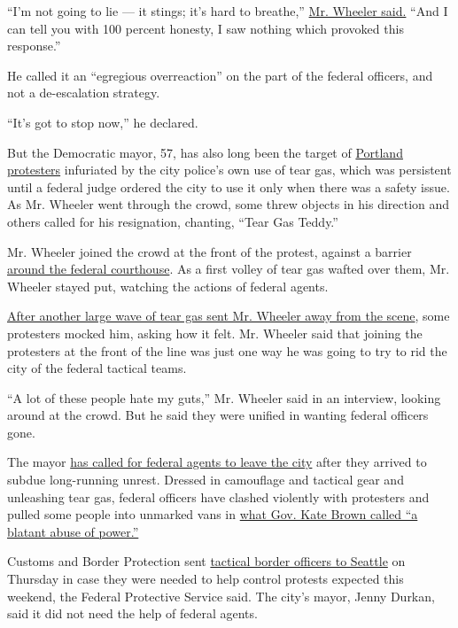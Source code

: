 ``I'm not going to lie --- it stings; it's hard to breathe,''
\href{https://twitter.com/ByMikeBaker/status/1286186731763412993}{Mr.
Wheeler said.} ``And I can tell you with 100 percent honesty, I saw
nothing which provoked this response.''

He called it an ``egregious overreaction'' on the part of the federal
officers, and not a de-escalation strategy.

``It's got to stop now,'' he declared.

But the Democratic mayor, 57, has also long been the target of
\href{https://www.nytimes3xbfgragh.onion/article/portland-protests-explained-protesters.html}{Portland
protesters} infuriated by the city police's own use of tear gas, which
was persistent until a federal judge ordered the city to use it only
when there was a safety issue. As Mr. Wheeler went through the crowd,
some threw objects in his direction and others called for his
resignation, chanting, ``Tear Gas Teddy.''

Mr. Wheeler joined the crowd at the front of the protest, against a
barrier
\href{https://www.nytimes3xbfgragh.onion/2020/07/22/us/portland-protests-courthouse.html}{around
the federal courthouse}. As a first volley of tear gas wafted over them,
Mr. Wheeler stayed put, watching the actions of federal agents.

\href{https://twitter.com/ByMikeBaker/status/1286194497559252992}{After
another large wave of tear gas sent Mr. Wheeler away from the scene},
some protesters mocked him, asking how it felt. Mr. Wheeler said that
joining the protesters at the front of the line was just one way he was
going to try to rid the city of the federal tactical teams.

``A lot of these people hate my guts,'' Mr. Wheeler said in an
interview, looking around at the crowd. But he said they were unified in
wanting federal officers gone.

The mayor
\href{https://www.nytimes3xbfgragh.onion/2020/07/21/us/portland-protests.html}{has
called for federal agents to leave the city} after they arrived to
subdue long-running unrest. Dressed in camouflage and tactical gear and
unleashing tear gas, federal officers have clashed violently with
protesters and pulled some people into unmarked vans in
\href{https://www.nytimes3xbfgragh.onion/2020/07/17/us/portland-protests.html}{what
Gov. Kate Brown called ``a blatant abuse of power.''}

Customs and Border Protection sent
\href{https://www.nytimes3xbfgragh.onion/2020/07/23/us/seattle-federal-agents-police.html}{tactical
border officers to Seattle} on Thursday in case they were needed to help
control protests expected this weekend, the Federal Protective Service
said. The city's mayor, Jenny Durkan, said it did not need the help of
federal agents.

